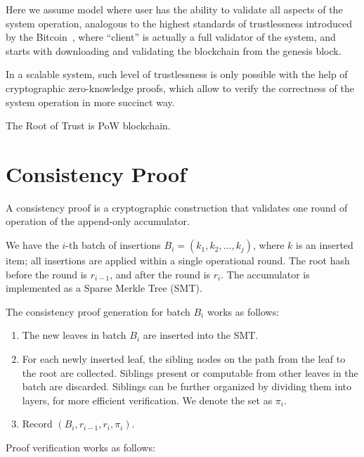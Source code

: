 \documentclass[twocolumn]{article}
\begin{document}
Here we assume model where user has the ability to validate all aspects of the system operation, analogous to the highest standards of trustlessness introduced by the Bitcoin~\cite{bitcoin}, where ``client'' is actually a full validator of the system, and starts with downloading and validating the blockchain from the genesis block.

In a scalable system, such level of trustlessness is only possible with the help of cryptographic zero-knowledge proofs, which allow to verify the correctness of the system operation in more succinct way.

The Root of Trust is PoW blockchain.


\section{Consistency Proof}
\label{sec:consistency-proof}

A consistency proof is a cryptographic construction that validates one round of operation of  the append-only accumulator.

We have the $i$-th batch of insertions $B_i = (k_1, k_2, \dots, k_j)$, where $k$ is an inserted item; all insertions are applied within a single operational round. The root hash before the round is $r_{i-1}$, and after the round is $r_i$. The accumulator is implemented as a Sparse Merkle Tree (SMT).

The consistency proof generation for batch $B_i$ works as follows:

\begin{enumerate}
    \item The new leaves in batch $B_i$ are inserted into the SMT.
    \item For each newly inserted leaf, the sibling nodes on the path from the leaf to the root are collected. Siblings present or computable from other leaves in the batch are discarded. Siblings can be further organized by dividing them into layers, for more efficient verification. We denote the set as $\pi_i$.
    \item Record $(B_i, r_{i-1}, r_i, \pi_i)$.
\end{enumerate}

Proof verification works as follows:
\end{document}

